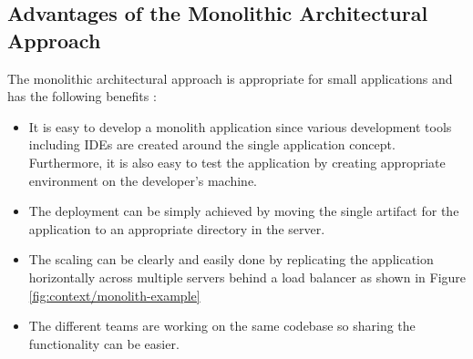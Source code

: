 \subsection{Advantages of the Monolithic Architectural Approach}\label{subsection:context/monolith-advantages}
The monolithic architectural approach is appropriate for small applications and has the following benefits \cite{Richardson:2014ab}\cite{Fowler:2014aa}\cite{Gupta:2015aa}\cite{Abram:2014aa} :
\begin{itemize}[leftmargin=.5in]
\item It is easy to develop a monolith application since various development tools including \acrshort{IDE}s are created around the single application concept. Furthermore, it is also easy to test the application by creating appropriate environment on the developer's machine.
\item The deployment can be simply achieved by moving the single artifact for the application to an appropriate directory in the server.
\item The scaling can be clearly and easily done by replicating the application horizontally across multiple servers behind a load balancer as shown in Figure \ref{fig:context/monolith-example}
\item The different teams are working on the same codebase so sharing the functionality can be easier.
\end{itemize}
\\
